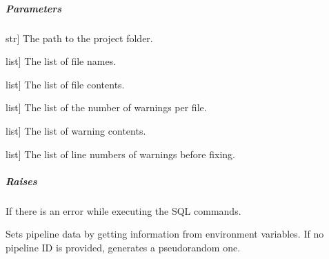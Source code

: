\documentclass[letterpaper,10pt,english]{sphinxmanual}
\begin{document}
\begin{fulllineitems}
\begin{fulllineitems}
\subparagraph{Parameters}
\label{\detokenize{main.db_operations:id8}}\begin{description}
\sphinxlineitem{project\_folder\_path}{[}str{]}
\sphinxAtStartPar
The path to the project folder.

\sphinxlineitem{file\_name\_list}{[}list{]}
\sphinxAtStartPar
The list of file names.

\sphinxlineitem{file\_content\_list}{[}list{]}
\sphinxAtStartPar
The list of file contents.

\sphinxlineitem{number\_of\_warnings\_list}{[}list{]}
\sphinxAtStartPar
The list of the number of warnings per file.

\sphinxlineitem{warning\_content\_llist}{[}list{]}
\sphinxAtStartPar
The list of warning contents.

\sphinxlineitem{line\_number\_pre\_fix\_llist}{[}list{]}
\sphinxAtStartPar
The list of line numbers of warnings before fixing.

\end{description}


\subparagraph{Raises}
\label{\detokenize{main.db_operations:id9}}\begin{description}
\sphinxAtStartPar
If there is an error while executing the SQL commands.

\end{description}

\end{fulllineitems}


\begin{fulllineitems}
\label{\detokenize{main.db_operations:main.db_operations.db_insertion_handler.DBInsertionHandler.set_pipeline_data}}
\pysigstartsignatures
{}
\pysigstopsignatures
\sphinxAtStartPar
Sets pipeline data by getting information from environment variables. If no pipeline ID is provided,
generates a pseudo\sphinxhyphen{}random one.

\end{fulllineitems}



\end{fulllineitems}
\end{document}
